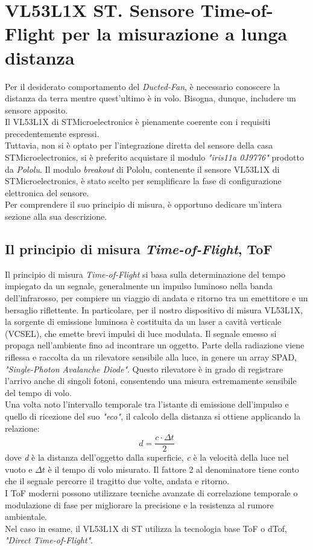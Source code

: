 \documentclass[11pt]{report}
\begin{document}
\section{VL53L1X ST. Sensore Time-of-Flight per la misurazione a lunga distanza}
Per il desiderato comportamento del \textit{Ducted-Fan}, è necessario conoscere la distanza da terra mentre quest'ultimo è in volo. Bisogna, dunque, includere un sensore apposito.\\
Il VL53L1X di STMicroelectronics è pienamente coerente con i requisiti precedentemente espressi.\\
Tuttavia, non si è optato per l'integrazione diretta del sensore della casa STMicroelectronics, si è preferito acquistare il modulo \textit{"iris11a 0J9776"} prodotto da \textit{Pololu}.
Il modulo \textit{breakout} di Pololu, contenente il sensore VL53L1X di STMicroelectronics, è stato scelto per semplificare la fase di configurazione elettronica del sensore.\\
Per comprendere il suo principio di misura, è opportuno dedicare un'intera sezione alla sua descrizione.

\subsection{Il principio di misura \textit{Time-of-Flight}, ToF}
Il principio di misura \textit{Time-of-Flight} si basa sulla determinazione del tempo impiegato da un segnale, generalmente un impulso luminoso nella banda dell'infrarosso, per compiere
un viaggio di andata e ritorno tra un emettitore e un bersaglio riflettente. In particolare, per il nostro dispositivo di misura VL53L1X, la sorgente di emissione luminosa è costituita da
un laser a cavità verticale (VCSEL), che emette brevi impulsi di luce modulata.
Il segnale emesso si propaga nell'ambiente fino ad incontrare un oggetto. Parte della radiazione viene riflessa e raccolta da un rilevatore sensibile alla luce, in genere un array SPAD,
\textit{"Single-Photon Avalanche Diode"}. Questo rilevatore è in grado di registrare l'arrivo anche di singoli fotoni, consentendo una misura estremamente sensibile del tempo di volo.\\
Una volta noto l'intervallo temporale tra l'istante di emissione dell'impulso e quello di ricezione del suo \textit{"eco"}, il calcolo della distanza si ottiene applicando la relazione:
\begin{equation}
    d = \frac{c \cdot \Delta t}{2}
\end{equation}
dove \textit{d} è la distanza dell'oggetto dalla superficie, \textit{c} è la velocità della luce nel vuoto e $\Delta t$ è il tempo di volo misurato. Il fattore 2 al denominatore tiene conto
che il segnale percorre il tragitto due volte, andata e ritorno.\\
I ToF moderni possono utilizzare tecniche avanzate di correlazione temporale o modulazione di fase per migliorare la precisione e la resistenza al rumore ambientale.\\
Nel caso in esame,  il VL53L1X di ST utilizza la tecnologia base ToF o dTof, \textit{"Direct Time-of-Flight"}.\\
\end{document}
